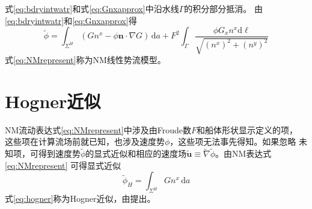 式\eqref{eq:bdryintwatr}和式\eqref{eq:Gnxapprox}中沿水线$\Gamma$的积分部分抵消。
由\eqref{eq:bdryintwatr}和\eqref{eq:Gnxapprox}得
\begin{equation}
  \tilde{\phi}=\int_{\Sigma^H}(Gn^x-\phi\mathbf{n}\cdot\nabla G)\,\mathrm{d}a
  +F^2\int_{\Gamma}
  \frac{\phi G_x n^x\mathrm{d}\ell}{\sqrt{(n^x)^2+(n^y)^2}}
  \label{eq:NMrepresent}
\end{equation}
式\eqref{eq:NMrepresent}称为NM线性势流模型\supercite{Noblesse2013Neumann}。

\section{Hogner近似}
\label{sec:hognerapprox}
NM流动表达式\eqref{eq:NMrepresent}中涉及由Froude数$F$和船体形状显示定义的项，
这些项在计算流场前就已知，也涉及速度势$\phi$，这些项无法事先得知。如果忽略
未知项，可得到速度势$\tilde\phi$的显式近似和相应的速度场$\widetilde{\mathbf{u}}\equiv\widetilde{\nabla}\tilde{\phi}$。由NM表达式\eqref{eq:NMrepresent}
可得显式近似
\begin{equation}
  \tilde\phi_H=\int_{\Sigma^H}Gn^x\,\mathrm{d}a
  \label{eq:hogner}
\end{equation}
式\eqref{eq:hogner}称为Hogner近似，由\parencite{Hogner1932Hydromech}提出。



